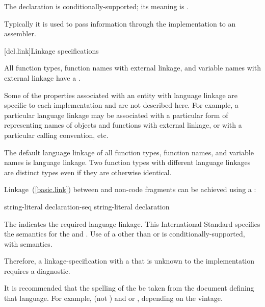 The  declaration is conditionally-supported; its meaning is
.
\begin{note}
Typically it is used to pass information through the implementation to
an assembler.
\end{note}

[dcl.link]{Linkage specifications}%

\pnum
All function types, function names with external linkage, and variable
names with external linkage have a .
\begin{note}
Some of the properties associated with an entity with language linkage
are specific to each implementation and are not described here. For
example, a particular language linkage may be associated with a
particular form of representing names of objects and functions with
external linkage, or with a particular calling convention, etc.
\end{note}
The default language linkage of all function types, function names, and
variable names is \Cpp language linkage. Two function types with
different language linkages are distinct types even if they are
otherwise identical.

\pnum
Linkage~(\ref{basic.link}) between \Cpp and  non-\Cpp code fragments can
be achieved using a :

%
%
%
\begin{bnf}
\br
     string-literal \terminal{\{} declaration-seq\opt{} \terminal{\}}\br
     string-literal declaration
\end{bnf}

The  indicates the required language linkage.
This International Standard specifies the semantics for the
  and . Use of a
 other than  or  is
conditionally-supported, with  semantics.
\begin{note}
Therefore, a linkage-specification with a  that
is unknown to the implementation requires a diagnostic.
\end{note}
\begin{note}
It is recommended that the spelling of the  be
taken from the document defining that language. For example, 
(not ) and  or , depending on
the vintage.
\end{note}

